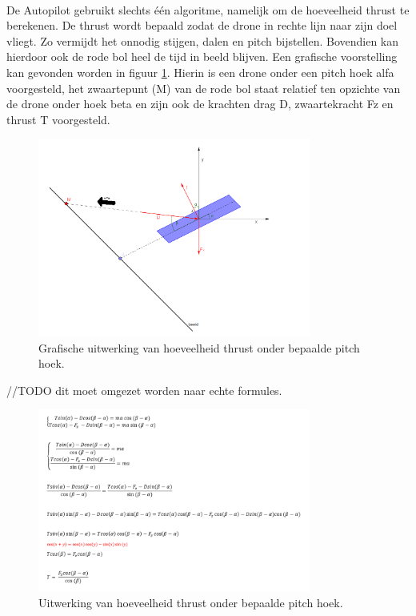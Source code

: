 \\
De Autopilot gebruikt slechts één algoritme, namelijk om de hoeveelheid thrust te berekenen. De thrust wordt bepaald zodat de drone in rechte lijn naar zijn doel vliegt. Zo vermijdt het onnodig stijgen, dalen en pitch bijstellen. Bovendien kan hierdoor ook de rode bol heel de tijd in beeld blijven. Een grafische voorstelling kan gevonden worden in figuur \ref{fig:GrafischeUitwerkingVanHoeveelheidThrustOnderBepaaldePitch}. Hierin is een drone onder een pitch hoek alfa voorgesteld, het zwaartepunt (M) van de rode bol staat relatief ten opzichte van de drone onder hoek beta en zijn ook de krachten drag D, zwaartekracht Fz en thrust T voorgesteld.

\begin{figure}[h]
	\centering
	\includegraphics[width=0.8\textwidth]{GrafischeUitwerkingVanHoeveelheidThrustOnderBepaaldePitch.png}
	\caption{Grafische uitwerking van hoeveelheid thrust onder bepaalde pitch hoek.}
	\label{fig:GrafischeUitwerkingVanHoeveelheidThrustOnderBepaaldePitch}
\end{figure}

//TODO dit moet omgezet worden naar echte formules. 
\begin{figure}[h]
	\centering
	\includegraphics[width=0.8\textwidth]{UitwerkingBerekeningVanHoeveelheidThrustOnderBepaaldePitch.png}
	\caption{Uitwerking van hoeveelheid thrust onder bepaalde pitch hoek.}
	\label{fig:UitwerkingBerekeningVanHoeveelheidThrustOnderBepaaldePitch}
\end{figure}

